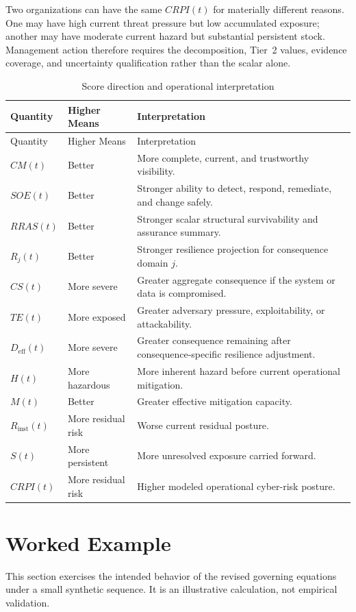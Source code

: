 \documentclass[11pt]{article}
\begin{document}
Two organizations can have the same $CRPI(t)$ for materially different reasons. One may
have high current threat pressure but low accumulated exposure; another may have
moderate current hazard but substantial persistent stock. Management action therefore
requires the decomposition, Tier~2 values, evidence coverage, and uncertainty
qualification rather than the scalar alone.

\begin{longtable}{p{} p{} p{}}
  \caption{Score direction and operational interpretation}
  \label{tab:score-direction}\\
  \toprule
  Quantity & Higher Means & Interpretation \\
  \midrule
  \endfirsthead
  \toprule
  Quantity & Higher Means & Interpretation \\
  \midrule
  \endhead
  $CM(t)$ & Better & More complete, current, and trustworthy visibility. \\
  $SOE(t)$ & Better & Stronger ability to detect, respond, remediate, and change safely. \\
  $RRAS(t)$ & Better & Stronger scalar structural survivability and assurance summary. \\
  $R_j(t)$ & Better & Stronger resilience projection for consequence domain $j$. \\
  $CS(t)$ & More severe & Greater aggregate consequence if the system or data is compromised. \\
  $TE(t)$ & More exposed & Greater adversary pressure, exploitability, or attackability. \\
  $D_{\mathrm{eff}}(t)$ & More severe & Greater consequence remaining after consequence-specific resilience adjustment. \\
  $H(t)$ & More hazardous & More inherent hazard before current operational mitigation. \\
  $M(t)$ & Better & Greater effective mitigation capacity. \\
  $R_{\mathrm{inst}}(t)$ & More residual risk & Worse current residual posture. \\
  $S(t)$ & More persistent & More unresolved exposure carried forward. \\
  $CRPI(t)$ & More residual risk & Higher modeled operational cyber-risk posture. \\
  \bottomrule
\end{longtable}

\section{Worked Example}
\label{sec:worked}
This section exercises the intended behavior of the revised governing equations under a
small synthetic sequence. It is an illustrative calculation, not empirical validation.
\end{document}
